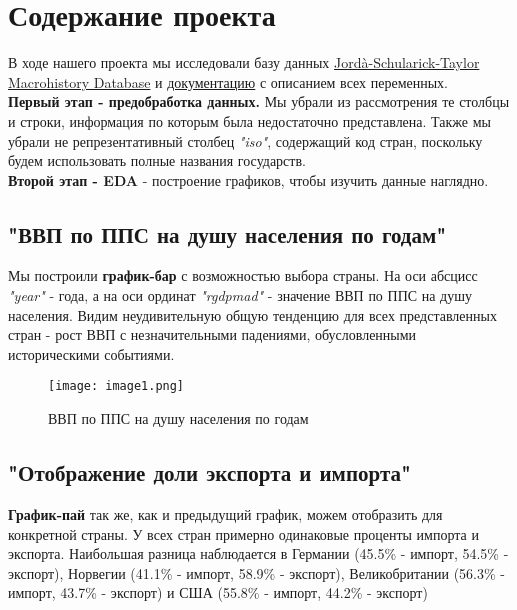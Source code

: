 \documentclass[12pt]{article}
\begin{document}
\section{\Large Содержание проекта}




\par В ходе нашего проекта мы исследовали базу данных \href{https://www.macrohistory.net/database/}{Jordà-Schularick-Taylor Macrohistory Database} и \href{https://www.macrohistory.net/app/download/9834516169/JST_documentationR6.pdf?t=1676279836}{документацию} с описанием всех переменных. \\

\textbf{Первый этап - предобработка данных.} Мы убрали из рассмотрения те столбцы и строки, информация по которым была недостаточно представлена. Также мы убрали не репрезентативный столбец \textit{"iso"{}}, содержащий код стран, поскольку будем использовать полные названия государств. \\

\textbf{Второй этап - EDA}
- построение графиков, чтобы изучить данные наглядно.


\subsection{"ВВП по ППС на душу населения по годам"{}}
 
 Мы построили \textbf{график-бар} с возможностью выбора страны. На оси абсцисс \textit{"year"{}} - года, а на оси ординат \textit{"rgdpmad"{}} -  значение ВВП по ППС на душу населения. Видим неудивительную общую тенденцию для всех представленных стран - рост ВВП с незначительными падениями, обусловленными историческими событиями.

\begin{figure}[h]
    \centering
    \texttt{[image: image1.png]} 
    \caption{ВВП по ППС на душу населения по годам}
    \label{fig:img1}
  \end{figure}

\subsection{"Отображение доли экспорта и импорта"{}}

\textbf{График-пай} так же, как и предыдущий график, можем отобразить для конкретной страны. У всех стран примерно одинаковые проценты импорта и экспорта. Наибольшая разница наблюдается в Германии (45.5\% - импорт, 54.5\% - экспорт), Норвегии (41.1\% - импорт, 58.9\% - экспорт), Великобритании (56.3\% - импорт, 43.7\% - экспорт) и США (55.8\% - импорт, 44.2\% - экспорт)
\end{document}
